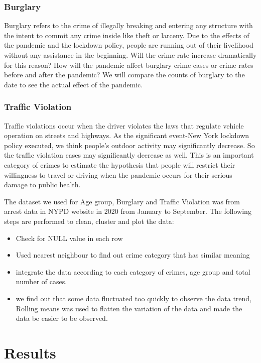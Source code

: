 \documentclass[conference]{IEEEtran}
\begin{document}
\subsubsection{Burglary}
Burglary refers to the crime of illegally breaking and entering any structure with the intent to commit any crime inside like theft or larceny. Due to the effects of the pandemic and the lockdown policy, people are running out of their livelihood without any assistance in the beginning. Will the crime rate increase dramatically for this reason? How will the pandemic affect burglary crime cases or crime rates before and after the pandemic? We will compare the counts of burglary to the date to see the actual effect of the pandemic.



\subsubsection{Traffic Violation}
Traffic violations occur when the driver violates the laws that regulate vehicle operation on streets and highways. As the significant event-New York lockdown policy executed, we think people's outdoor activity may significantly decrease. So the traffic violation cases may significantly decrease as well. This is an important category of crimes to estimate the hypothesis that people will restrict their willingness to travel or driving when the pandemic occurs for their serious damage to public health.

The dataset we used for Age group, Burglary and Traffic Violation was from arrest data in NYPD website in 2020 from January to September. The following steps are performed to clean, cluster and plot the data:
\begin{itemize}
\item Check for NULL value in each row
\item Used nearest neighbour to find out crime category that has similar meaning
\item integrate the data according to each category of crimes, age group and total number of cases.
\item we find out that some data fluctuated too quickly to observe the data trend, Rolling means was used to flatten the variation of the data and made the data be easier to be observed.
\end{itemize}
\section{Results}
\end{document}
